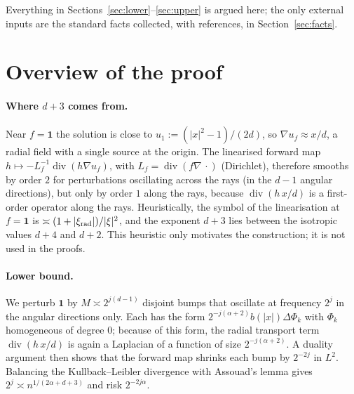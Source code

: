 \documentclass[11pt]{article}
\theoremstyle{definition}
\theoremstyle{remark}
\newcommand{\one}{\mathbf 1}
\newcommand{\dv}{\operatorname{div}}
\begin{document}
Everything in Sections~\ref{sec:lower}--\ref{sec:upper} is argued here; the only external inputs are the standard facts collected, with references, in Section~\ref{sec:facts}.

\section{Overview of the proof}

\paragraph{Where $d+3$ comes from.} Near $f=\one$ the solution is close to $u_1:=(|x|^2-1)/(2d)$, so $\nabla u_f\approx x/d$, a radial field with a single source at the origin. The linearised forward map $h\mapsto -L_f^{-1}\dv(h\nabla u_f)$, with $L_f=\dv(f\nabla\,\cdot)$ (Dirichlet), therefore smooths by order $2$ for perturbations oscillating across the rays (in the $d-1$ angular directions), but only by order $1$ along the rays, because $\dv(h\,x/d)$ is a first-order operator along the rays. Heuristically, the symbol of the linearisation at $f=\one$ is $\asymp(1+|\xi_{\rm rad}|)/|\xi|^2$, and the exponent $d+3$ lies between the isotropic values $d+4$ and $d+2$. This heuristic only motivates the construction; it is not used in the proofs.

\paragraph{Lower bound.} We perturb $\one$ by $M\asymp2^{j(d-1)}$ disjoint bumps that oscillate at frequency $2^j$ in the angular directions only. Each has the form $2^{-j(\alpha+2)}b(|x|)\Delta\Phi_k$ with $\Phi_k$ homogeneous of degree $0$; because of this form, the radial transport term $\dv(h\,x/d)$ is again a Laplacian of a function of size $2^{-j(\alpha+2)}$. A duality argument then shows that the forward map shrinks each bump by $2^{-2j}$ in $L^2$. Balancing the Kullback--Leibler divergence with Assouad's lemma gives $2^j\asymp n^{1/(2\alpha+d+3)}$ and risk $2^{-2j\alpha}$.
\end{document}
